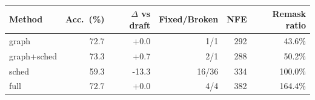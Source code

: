 \begin{tabular}{lrrrrr}
\toprule
Method & Acc.\ (\%) & $\Delta$ vs draft & Fixed/Broken & NFE & Remask ratio \\
\midrule
graph & 72.7 & +0.0 & 1/1 & 292 & 43.6\% \\
graph+sched & 73.3 & +0.7 & 2/1 & 288 & 50.2\% \\
sched & 59.3 & -13.3 & 16/36 & 334 & 100.0\% \\
full & 72.7 & +0.0 & 4/4 & 382 & 164.4\% \\
\bottomrule
\end{tabular}
